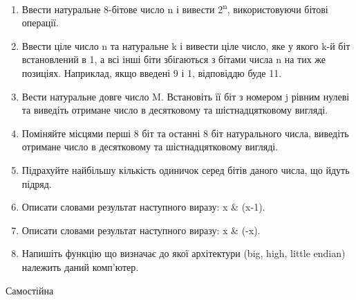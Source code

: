 \documentclass[]{article}
\begin{document}
\begin{enumerate}
\def\labelenumi{\arabic{enumi})}
\item
  \protect\hypertarget{_Hlk65235695}{}{}Ввести натуральне 8-бітове число
  n і вивести 2\textsuperscript{n}, використовуючи бітові операції.
\item
  Ввести ціле число n та натуральне k і вивести ціле число, яке у якого
  k-й біт встановлений в 1, а всі інші біти збігаються з бітами числа n
  на тих же позиціях. Наприклад, якщо введені 9 і 1, відповіддю буде 11.
\item
  Вести натуральне довге число
  \protect\hypertarget{__DdeLink__4_8035966481}{}{}M. Встановіть її біт
  з номером j рівним нулеві та виведіть отримане число в десятковому та
  шістнадцятковому вигляді.
\item
  Поміняйте місцями перші 8 біт та останні 8 біт натурального числа,
  виведіть отримане число в десятковому та шістнадцятковому вигляді.
\item
  Підрахуйте найбільшу кількість одиничок серед бітів даного числа, що
  йдуть підряд.
\item
  Описати словами результат наступного виразу: x \& (x-1).
\item
  Описати словами результат наступного виразу: x \& (-x).
\item
  Напишіть функцію що визначає до якої архітектури (big, high, little
  endian) належить даний комп'ютер.
\end{enumerate}

Самостійна
\end{document}
